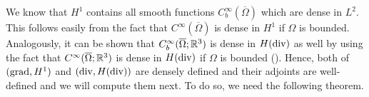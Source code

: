 \documentclass[../main.tex]{subfiles}
\begin{document}
    



We know that $H^1$ contains all smooth functions 
$C_b^\infty(\overline{\Omega})$ which are dense in $L^2$. This follows easily 
from the fact that $C^\infty(\overline{\Omega})$ is dense in $H^1$ if $\Omega$ is bounded.
Analogously,
it can be shown that $C_b^\infty(\overline{\Omega};\mathbb{R}^3)$ is dense in $H(\operatorname{div})$ as well 
by using the fact that $C^\infty(\overline{\Omega};\mathbb{R}^3)$ is dense in $H(\operatorname{div})$ if $\Omega$
is bounded (\cite[Thm. 3.22]{monk}).
Hence, 
both of $(\operatorname{grad},H^1)$ and $(\operatorname{div},H(\operatorname{div}))$ are densely defined and 
their adjoints are well-defined and we will compute them next. To do so, 
we need the following theorem.
\end{document}
